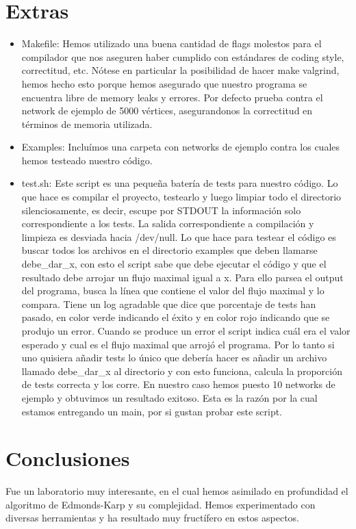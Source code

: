 \documentclass[11pt]{article}
\begin{document}
\section{Extras}
\label{sec-6}

\begin{itemize}
\item Makefile: Hemos utilizado una buena cantidad de flags molestos para
  el compilador que nos aseguren haber cumplido con estándares de
  coding style, correctitud, etc. Nótese en particular la posibilidad
  de hacer make valgrind, hemos hecho esto porque hemos asegurado que
  nuestro programa se encuentra libre de memory leaks y errores. Por
  defecto prueba contra el network de ejemplo de 5000 vértices,
  asegurandonos la correctitud en términos de memoria utilizada.
\item Examples: Incluímos una carpeta con networks de ejemplo contra los
  cuales hemos testeado nuestro código.
\item test.sh: Este script es una pequeña batería de tests para nuestro
  código. Lo que hace es compilar el proyecto, testearlo y luego
  limpiar todo el directorio silenciosamente, es decir, escupe por
  STDOUT la información solo correspondiente a los tests. La salida
  correspondiente a compilación y limpieza es desviada hacia
  /dev/null. Lo que hace para testear el código es buscar todos los
  archivos en el directorio examples que deben llamarse debe\_dar\_x,
  con esto el script sabe que debe ejecutar el código y que el
  resultado debe arrojar un flujo maximal igual a x. Para
  ello parsea el output del programa, busca la línea que contiene el
  valor del flujo maximal y lo compara. Tiene un log agradable que
  dice que porcentaje de tests han pasado, en color verde indicando
  el éxito y en color rojo indicando que se produjo un error. Cuando
  se produce un error el script indica cuál era el valor esperado y
  cual es el flujo maximal que arrojó el programa. Por lo tanto si
  uno quisiera añadir tests lo único que debería hacer es añadir un
  archivo llamado debe\_dar\_x al directorio y con esto funciona,
  calcula la proporción de tests correcta y los corre. En nuestro
  caso hemos puesto 10 networks de ejemplo y obtuvimos un resultado
  exitoso. Esta es la razón por la cual estamos entregando un main,
  por si gustan probar este script.
\end{itemize}
\section{Conclusiones}
\label{sec-7}

Fue un laboratorio muy interesante, en el cual hemos asimilado en
profundidad el algoritmo de Edmonds-Karp y su complejidad. Hemos
experimentado con diversas herramientas y ha resultado muy fructífero
en estos aspectos.
\end{document}
